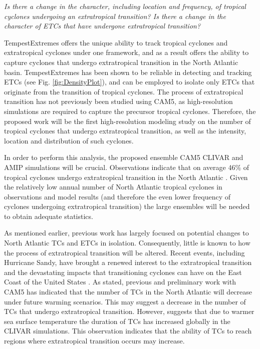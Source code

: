 \documentclass[11pt]{article}
\begin{document}
\emph{Is there a change in the character, including location and frequency, of tropical cyclones undergoing an extratropical transition?  Is there a change in the character of ETCs that have undergone extratropical transition?}

TempestExtremes offers the unique ability to track tropical cyclones and extratropical cyclones under one framework, and as a result offers the ability to capture cyclones that undergo extratropical transition in the North Atlantic basin.  TempestExtremes has been shown to be reliable in detecting and tracking ETCs (see Fig. \ref{fig:DensityPlot}), and can be employed to isolate only ETCs that originate from the transition of tropical cyclones. The process of extratropical transition has not previously been studied using CAM5, as high-resolution simulations are required to capture the precursor tropical cyclones. Therefore, the proposed work will be the first high-resolution modeling study on the number of tropical cyclones that undergo extratropical transition, as well as the intensity, location and distribution of such cyclones.  

In order to perform this analysis, the proposed ensemble CAM5 CLIVAR and AMIP simulations will be crucial.  Observations indicate that on average 46$\%$ of tropical cyclones undergo extratropical transition in the North Atlantic \citep{hart2001climatology}. Given the relatively low annual number of North Atlantic tropical cyclones in observations and model results (and therefore the even lower frequency of cyclones undergoing extratropical transition) the large ensembles will be needed to obtain adequate statistics.

As mentioned earlier, previous work has largely focused on potential changes to North Atlantic TCs and ETCs in isolation.  Consequently, little is known to how the process of extratropical transition will be altered. Recent events, including Hurricane Sandy, have brought a renewed interest to the extratropical transition and the devastating impacts that transitioning cyclones can have on the East Coast of the United States \citep{Blake2013}. As stated, previous and preliminary work with CAM5 has indicated that the number of TCs in the North Atlantic will decrease under future warming scenarios. This may suggest a decrease in the number of TCs that undergo extratropical transition.  However, \citet{Wehner2015} suggests that due to warmer sea surface temperature the duration of TCs has increased globally in the  CLIVAR simulations.  This observation indicates that the ability of TCs to reach regions where extratropical transition occurs may increase.
\end{document}
